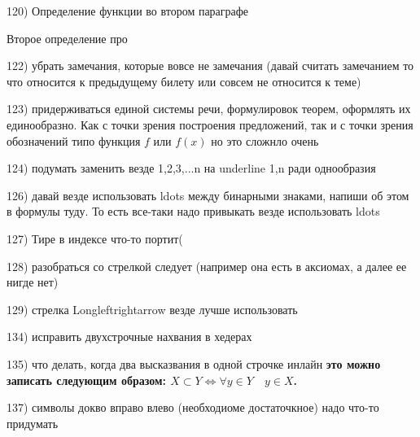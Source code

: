 120) Определение функции во втором параграфе 

Второе определение про 
\begin{defnn}
\end{defnn}

122) убрать замечания, которые вовсе не замечания (давай считать замечанием то что относится к предыдущему билету или совсем не относится к теме)

123) придерживаться единой системы речи, формулировок теорем, оформлять их единообразно. Как с точки зрения построения предложений, так и с точки зрения обозначений типо функция $f$ или $f(x)$ но это сложнло очень

124) подумать заменить везде 1,2,3,...n на underline 1,n ради однообразия

126) давай везде использовать ldots между бинарными знаками, напиши об этом в формулы туду. То есть все-таки надо привыкать везде использовать ldots

127) Тире в индексе что-то портит(

128) разобраться со стрелкой следует (например она есть в аксиомах, а далее ее нигде нет)

129) стрелка Longleftrightarrow везде лучше использовать

134) исправить двухстрочные нахвания в хедерах

135) что делать, когда два высказвания в одной строчке инлайн   \textbf{это можно записать следующим образом: $X \subset Y \Longleftrightarrow \forall y\in Y\quad  y\in X$.}

137) символы докво вправо влево (необходиоме достаточкное) надо что-то придумать

